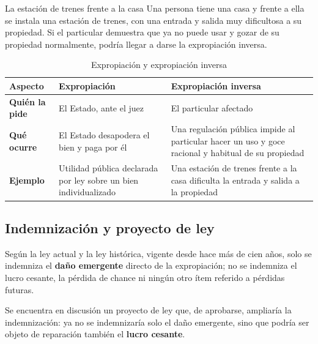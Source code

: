 \documentclass[12pt,oneside]{book}
\begin{document}
\begin{example}{La estación de trenes frente a la casa}
Una persona tiene una casa y frente a ella se instala una estación de trenes, con una entrada y salida muy dificultosa a su propiedad. Si el particular demuestra que ya no puede usar y gozar de su propiedad normalmente, podría llegar a darse la expropiación inversa.
\end{example}

\begin{table}[H]
\centering
\renewcommand{\arraystretch}{1.3}
\begin{tabularx}{\textwidth}{
    >{\raggedright\arraybackslash}p{}
    >{\raggedright\arraybackslash}X
    >{\raggedright\arraybackslash}X
}
\toprule
\textbf{Aspecto} & \textbf{Expropiación} & \textbf{Expropiación inversa} \\
\midrule
\textbf{Quién la pide} & El Estado, ante el juez & El particular afectado \\
\textbf{Qué ocurre} & El Estado desapodera el bien y paga por él & Una regulación pública impide al particular hacer un uso y goce racional y habitual de su propiedad \\
\textbf{Ejemplo} & Utilidad pública declarada por ley sobre un bien individualizado & Una estación de trenes frente a la casa dificulta la entrada y salida a la propiedad \\
\bottomrule
\end{tabularx}
\caption{Expropiación y expropiación inversa}
\end{table}

\subsection{Indemnización y proyecto de ley}

Según la ley actual y la ley histórica, vigente desde hace más de cien años, solo se indemniza el \textbf{daño emergente} directo de la expropiación; no se indemniza el lucro cesante, la pérdida de chance ni ningún otro ítem referido a pérdidas futuras.

Se encuentra en discusión un proyecto de ley que, de aprobarse, ampliaría la indemnización: ya no se indemnizaría solo el daño emergente, sino que podría ser objeto de reparación también el \textbf{lucro cesante}.
\end{document}
